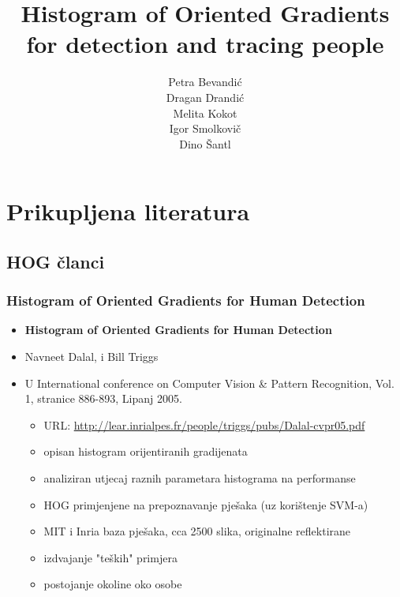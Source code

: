 \documentclass[times, utf8, seminar, numeric]{fer}
\begin{document}
\title{Histogram of Oriented Gradients for detection and tracing people}

\author{Petra Bevandić \\ Dragan Drandić \\ Melita Kokot \\ Igor Smolkovič \\ Dino Šantl}

\maketitle

\tableofcontents

\chapter{Prikupljena literatura}

\section{HOG članci}

\subsection{Histogram of Oriented Gradients for Human Detection}

\begin{itemize}

\item \textbf{Histogram of Oriented Gradients for Human Detection} 
\item Navneet Dalal, i Bill Triggs
\item U International conference on Computer Vision \& Pattern Recognition, Vol. 1, stranice 886-893, Lipanj 2005.
	\begin{itemize} 
		\item URL: \url{http://lear.inrialpes.fr/people/triggs/pubs/Dalal-cvpr05.pdf}
		\item opisan histogram orijentiranih gradijenata
		\item analiziran utjecaj raznih parametara histograma na performanse
		\item HOG primjenjene na prepoznavanje pješaka (uz korištenje SVM-a)
		\item MIT i Inria baza pješaka, cca 2500 slika, originalne reflektirane
		\item izdvajanje "teških" primjera
		\item postojanje okoline oko osobe
	\end{itemize}
\end{itemize}
\end{document}

